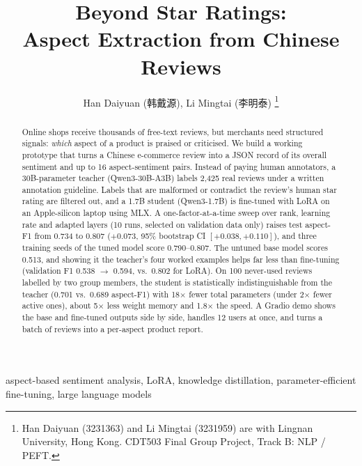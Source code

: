 \documentclass[journal]{IEEEtran}
\begin{document}
\title{Beyond Star Ratings:\\Aspect Extraction from Chinese Reviews}

\author{Han Daiyuan (韩戴源), Li Mingtai (李明泰)%
\thanks{Han Daiyuan (3231363) and Li Mingtai (3231959) are with Lingnan University, Hong Kong.
CDT503 Final Group Project, Track B: NLP / PEFT.}}

\maketitle

\begin{abstract}
Online shops receive thousands of free-text reviews, but merchants need structured signals: \emph{which} aspect of a
product is praised or criticised. We build a working prototype that turns a Chinese e-commerce review into a JSON
record of its overall sentiment and up to 16 aspect-sentiment pairs. Instead of paying human annotators, a 30B-parameter
teacher (Qwen3-30B-A3B) labels 2{,}425 real reviews under a written annotation guideline. Labels that are malformed or
contradict the review's human star rating are filtered out, and a 1.7B student (Qwen3-1.7B) is fine-tuned with LoRA on
an Apple-silicon laptop using MLX. A one-factor-at-a-time sweep over rank, learning rate and adapted layers (10 runs,
selected on validation data only) raises test aspect-F1 from 0.734 to 0.807 ($+0.073$, 95\% bootstrap CI
$[+0.038, +0.110]$), and three training seeds of the tuned model score 0.790--0.807. The untuned base model scores 0.513,
and showing it the teacher's four worked examples helps far less than fine-tuning (validation F1 0.538 $\rightarrow$
0.594, vs.\ 0.802 for LoRA). On 100 never-used reviews
labelled by two group members, the student is statistically indistinguishable from the teacher (0.701 vs.\ 0.689
aspect-F1) with 18$\times$ fewer total parameters (under 2$\times$ fewer active ones), about 5$\times$ less weight memory
and 1.8$\times$ the speed. A Gradio demo shows the base and fine-tuned outputs side by side, handles 12 users at once,
and turns a batch of reviews into a per-aspect product report.
\end{abstract}

\begin{IEEEkeywords}
aspect-based sentiment analysis, LoRA, knowledge distillation, parameter-efficient fine-tuning, large language models
\end{IEEEkeywords}

\end{document}
